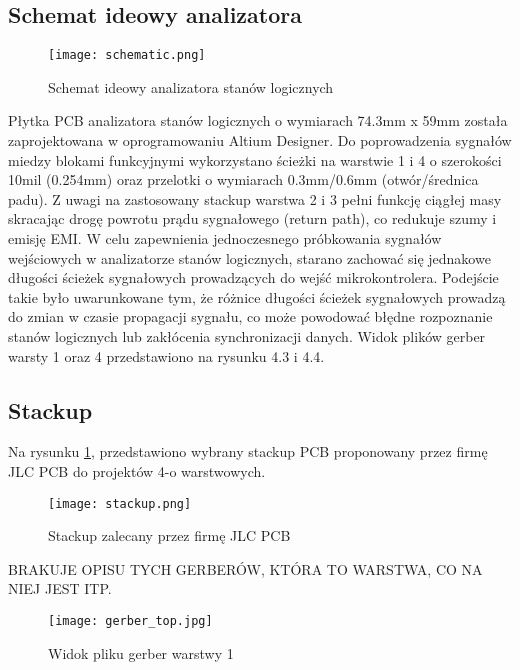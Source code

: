 \useNormalLandscape{}
\subsection{Schemat ideowy analizatora}
    \begin{figure}[!ht]
        \centering
        \texttt{[image: schematic.png]}
        \caption{Schemat ideowy analizatora stanów logicznych}
    \end{figure}
\usePortrait{}

    Płytka PCB analizatora stanów logicznych o wymiarach 74.3mm x 59mm została zaprojektowana w oprogramowaniu Altium Designer.
    Do poprowadzenia sygnałów miedzy blokami funkcyjnymi wykorzystano ścieżki na warstwie 1 i 4 o szerokości 10mil (0.254mm)
    oraz przelotki o wymiarach 0.3mm/0.6mm (otwór/średnica padu). Z uwagi na zastosowany stackup warstwa 2 i 3 pełni funkcję
    ciągłej masy skracając drogę powrotu prądu sygnałowego (return path), co redukuje szumy i emisję EMI.
    W celu zapewnienia jednoczesnego próbkowania sygnałów wejściowych w analizatorze stanów logicznych, starano zachować się
    jednakowe długości ścieżek sygnałowych prowadzących do wejść mikrokontrolera.
    Podejście takie było uwarunkowane tym, że różnice długości ścieżek sygnałowych prowadzą do zmian w czasie propagacji
    sygnału, co może powodować błędne rozpoznanie stanów logicznych lub zakłócenia synchronizacji danych.
    Widok plików gerber warsty 1 oraz 4 przedstawiono
    na rysunku 4.3 i 4.4.
    
\subsection{Stackup}
    Na rysunku \ref{fig:stackup}, przedstawiono wybrany stackup PCB proponowany przez firmę JLC PCB do projektów 4-o warstwowych.
    \begin{figure}[H]
        \centering
        \texttt{[image: stackup.png]}
        \caption{Stackup zalecany przez firmę JLC PCB}
        \label{fig:stackup}
    \end{figure}


    BRAKUJE OPISU TYCH GERBERÓW, KTÓRA TO WARSTWA, CO NA NIEJ JEST ITP.
     \begin{figure}[H]
        \centering
        \texttt{[image: gerber\_top.jpg]}
        \caption{Widok pliku gerber warstwy 1 }
        \label{fig:gerber_top}
    \end{figure}

